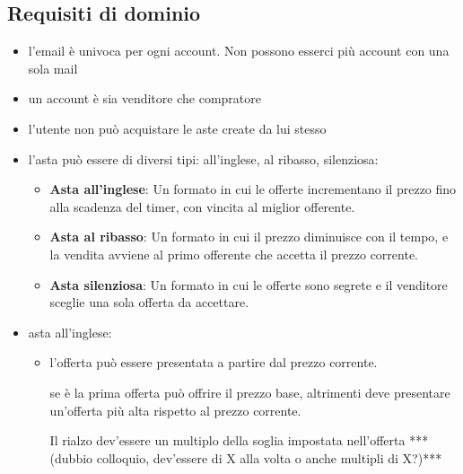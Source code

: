 \newpage
\subsection{Requisiti di dominio}
\begin{itemize}
	\item l'email è univoca per ogni account. Non possono esserci più account con una sola mail
	\item un account è sia venditore che compratore
	\item l'utente non può acquistare le aste create da lui stesso
	\item l'asta può essere di diversi tipi: all'inglese, al ribasso, silenziosa:
	      \begin{itemize}[label={\tiny$\blacksquare$}]
		      \item {\sffamily \textbf{Asta all'inglese}}: Un formato in cui le offerte incrementano il prezzo fino alla scadenza del timer, con vincita al miglior offerente.
		      \item {\sffamily \textbf{Asta al ribasso}}: Un formato in cui il prezzo diminuisce con il tempo, e la vendita avviene al primo offerente che accetta il prezzo corrente.
		      \item {\sffamily \textbf{Asta silenziosa}}: Un formato in cui le offerte sono segrete e il venditore sceglie una sola offerta da accettare.
	      \end{itemize}
	\item asta all'inglese:
	      \begin{itemize}[label={\tiny$\blacksquare$}]
		      \item l'offerta può essere presentata a partire dal prezzo corrente.

		            se è la prima offerta può offrire il prezzo base, altrimenti deve presentare un'offerta più alta rispetto al prezzo corrente.

		            Il rialzo dev'essere un multiplo della soglia impostata nell'offerta ***(dubbio colloquio, dev'essere di X alla volta o anche multipli di X?)***


\end{itemize}
\end{itemize}
